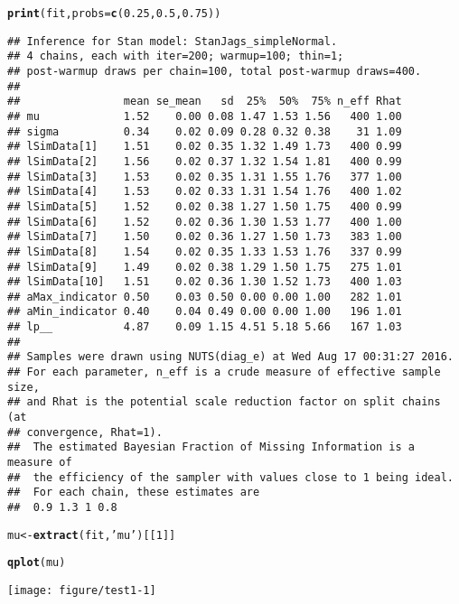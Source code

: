 \documentclass{book}\usepackage[]{graphicx}\usepackage[]{color}
\makeatletter
\def\maxwidth{ %
  \ifdim\Gin@nat@width>\linewidth
    \linewidth
  \else
    \Gin@nat@width
  \fi
}
\newcommand{\hlnum}[1]{\textcolor[rgb]{0.686,0.059,0.569}{#1}}%
\newcommand{\hlstr}[1]{\textcolor[rgb]{0.192,0.494,0.8}{#1}}%
\newcommand{\hlstd}[1]{\textcolor[rgb]{0.345,0.345,0.345}{#1}}%
\newcommand{\hlkwb}[1]{\textcolor[rgb]{0.69,0.353,0.396}{#1}}%
\newcommand{\hlkwc}[1]{\textcolor[rgb]{0.333,0.667,0.333}{#1}}%
\newcommand{\hlkwd}[1]{\textcolor[rgb]{0.737,0.353,0.396}{\textbf{#1}}}%
\newenvironment{kframe}{%
 \def\at@end@of@kframe{}%
 \ifinner\ifhmode%
  \def\at@end@of@kframe{\end{minipage}}%
  \begin{minipage}{\columnwidth}%
 \fi\fi%
 \def\FrameCommand##1{\hskip\@totalleftmargin \hskip-\fboxsep
 \colorbox{shadecolor}{##1}\hskip-\fboxsep
     \hskip-\linewidth \hskip-\@totalleftmargin \hskip\columnwidth}%
 \MakeFramed {\advance\hsize-\width
   \@totalleftmargin\z@ \linewidth\hsize
   \@setminipage}}%
 {\par\unskip\endMakeFramed%
 \at@end@of@kframe}
\newenvironment{knitrout}{}{} %
\makeatother
\begin{document}
\begin{knitrout}
\begin{kframe}
\begin{alltt}
\hlkwd{print}\hlstd{(fit,}\hlkwc{probs}\hlstd{=}\hlkwd{c}\hlstd{(}\hlnum{0.25}\hlstd{,}\hlnum{0.5}\hlstd{,}\hlnum{0.75}\hlstd{))}
\end{alltt}
\begin{verbatim}
## Inference for Stan model: StanJags_simpleNormal.
## 4 chains, each with iter=200; warmup=100; thin=1; 
## post-warmup draws per chain=100, total post-warmup draws=400.
## 
##                mean se_mean   sd  25%  50%  75% n_eff Rhat
## mu             1.52    0.00 0.08 1.47 1.53 1.56   400 1.00
## sigma          0.34    0.02 0.09 0.28 0.32 0.38    31 1.09
## lSimData[1]    1.51    0.02 0.35 1.32 1.49 1.73   400 0.99
## lSimData[2]    1.56    0.02 0.37 1.32 1.54 1.81   400 0.99
## lSimData[3]    1.53    0.02 0.35 1.31 1.55 1.76   377 1.00
## lSimData[4]    1.53    0.02 0.33 1.31 1.54 1.76   400 1.02
## lSimData[5]    1.52    0.02 0.38 1.27 1.50 1.75   400 0.99
## lSimData[6]    1.52    0.02 0.36 1.30 1.53 1.77   400 1.00
## lSimData[7]    1.50    0.02 0.36 1.27 1.50 1.73   383 1.00
## lSimData[8]    1.54    0.02 0.35 1.33 1.53 1.76   337 0.99
## lSimData[9]    1.49    0.02 0.38 1.29 1.50 1.75   275 1.01
## lSimData[10]   1.51    0.02 0.36 1.30 1.52 1.73   400 1.03
## aMax_indicator 0.50    0.03 0.50 0.00 0.00 1.00   282 1.01
## aMin_indicator 0.40    0.04 0.49 0.00 0.00 1.00   196 1.01
## lp__           4.87    0.09 1.15 4.51 5.18 5.66   167 1.03
## 
## Samples were drawn using NUTS(diag_e) at Wed Aug 17 00:31:27 2016.
## For each parameter, n_eff is a crude measure of effective sample size,
## and Rhat is the potential scale reduction factor on split chains (at 
## convergence, Rhat=1).
##  The estimated Bayesian Fraction of Missing Information is a measure of
##  the efficiency of the sampler with values close to 1 being ideal.
##  For each chain, these estimates are
##  0.9 1.3 1 0.8
\end{verbatim}
\begin{alltt}
\hlstd{mu} \hlkwb{<-} \hlkwd{extract}\hlstd{(fit,}\hlstr{'mu'}\hlstd{)[[}\hlnum{1}\hlstd{]]}

\hlkwd{qplot}\hlstd{(mu)}
\end{alltt}


{\ttfamily\noindent\itshape\color{messagecolor}{\#\# `stat\_bin()` using `bins = 30`. Pick better value with `binwidth`.}}\end{kframe}
\texttt{[image: figure/test1-1]} 

\end{knitrout}
\end{document}
